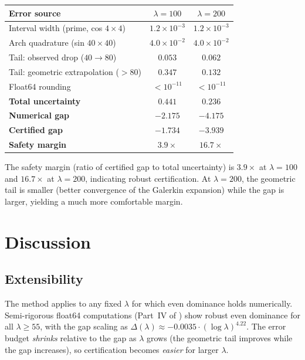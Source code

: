 \documentclass[12pt,a4paper]{article}
\theoremstyle{definition}
\theoremstyle{remark}
\begin{document}
\begin{center}
\renewcommand{\arraystretch}{1.2}
\begin{tabular}{lcc}
\toprule
\textbf{Error source} & $\lambda = 100$ & $\lambda = 200$ \\
\midrule
Interval width (prime, cos $4{\times}4$) & $1.2 \times 10^{-3}$ & $1.2 \times 10^{-3}$ \\
Arch quadrature (sin $40{\times}40$) & $4.0 \times 10^{-2}$ & $4.0 \times 10^{-2}$ \\
Tail: observed drop ($40 \to 80$) & $0.053$ & $0.062$ \\
Tail: geometric extrapolation ($>80$) & $0.347$ & $0.132$ \\
Float64 rounding & $< 10^{-11}$ & $< 10^{-11}$ \\
\midrule
\textbf{Total uncertainty} & $0.441$ & $0.236$ \\
\textbf{Numerical gap} & $-2.175$ & $-4.175$ \\
\textbf{Certified gap} & $-1.734$ & $-3.939$ \\
\textbf{Safety margin} & $3.9\times$ & $16.7\times$ \\
\bottomrule
\end{tabular}
\end{center}

The safety margin (ratio of certified gap to total uncertainty) is $3.9\times$ at $\lambda = 100$ and $16.7\times$ at $\lambda = 200$, indicating robust certification. At $\lambda = 200$, the geometric tail is smaller (better convergence of the Galerkin expansion) while the gap is larger, yielding a much more comfortable margin.


\section{Discussion}
\label{sec:discussion}

\subsection{Extensibility}

The method applies to any fixed $\lambda$ for which even dominance holds numerically. Semi-rigorous float64 computations (Part~IV of \cite{Geiger2026partIV}) show robust even dominance for all $\lambda \geq 55$, with the gap scaling as $\Delta(\lambda) \approx -0.0035 \cdot (\log\lambda)^{4.22}$. The error budget \emph{shrinks} relative to the gap as $\lambda$ grows (the geometric tail improves while the gap increases), so certification becomes \emph{easier} for larger $\lambda$.
\end{document}
